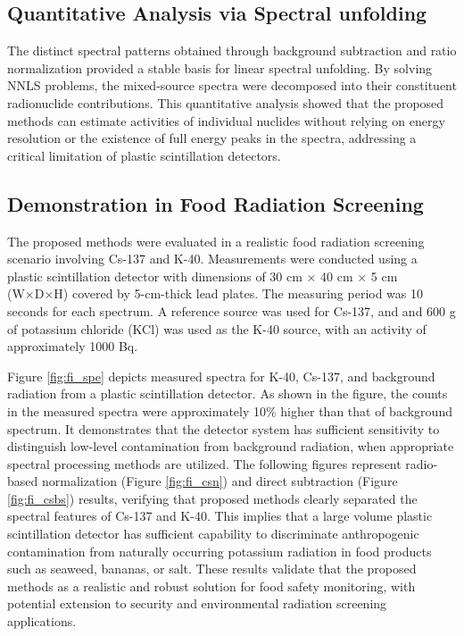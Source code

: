 \documentclass[10pt]{wlscirep}
\begin{document}
\subsection*{Quantitative Analysis via Spectral unfolding}

The distinct spectral patterns obtained through background subtraction and ratio normalization provided a stable basis for linear spectral unfolding. By solving NNLS problems, the mixed-source spectra were decomposed into their constituent radionuclide contributions. This quantitative analysis showed that the proposed methods can estimate activities of individual nuclides without relying on energy resolution or the existence of full energy peaks in the spectra, addressing a critical limitation of plastic scintillation detectors.

\subsection*{Demonstration in Food Radiation Screening}

The proposed methods were evaluated in a realistic food radiation screening scenario involving Cs-137 and K-40. Measurements were conducted using a plastic scintillation detector with dimensions of 30 cm × 40 cm × 5 cm (W×D×H) covered by 5-cm-thick lead plates. The measuring period was 10 seconds for each spectrum. A reference source was used for Cs-137, and and 600 g of potassium chloride (KCl) was used as the K-40 source, with an activity of approximately 1000 Bq.

Figure \ref{fig:fi_spe} depicts measured spectra for K-40, Cs-137, and background radiation from a plastic scintillation detector. As shown in the figure, the counts in the measured spectra were approximately 10\% higher than that of background spectrum. It demonstrates that the detector system has sufficient sensitivity to distinguish low-level contamination from background radiation, when appropriate spectral processing methods are utilized. The following figures represent radio-based normalization (Figure \ref{fig:fi_csn}) and direct subtraction (Figure \ref{fig:fi_csbs}) results, verifying that proposed methods clearly separated the spectral features of Cs-137 and K-40. This implies that a large volume plastic scintillation detector has sufficient capability to discriminate anthropogenic contamination from naturally occurring potassium radiation in food products such as seaweed, bananas, or salt. These results validate that the proposed methods as a realistic and robust solution for food safety monitoring, with potential extension to security and environmental radiation screening applications.
\end{document}
